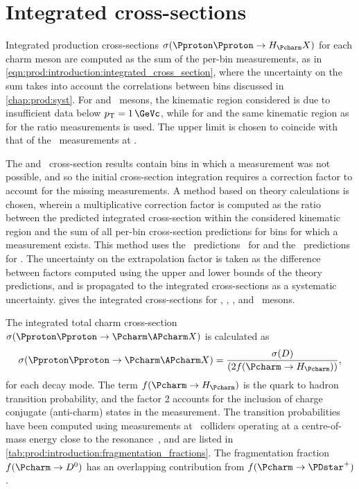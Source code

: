 \section{Integrated cross-sections}
\label{chap:prod:results:integrated}

Integrated production cross-sections $\xsec(\ppToHc{}X)$ for each charm meson 
are computed as the sum of the per-bin measurements, as in 
\cref{eqn:prod:introduction:integrated_cross_section}, where the uncertainty on 
the sum takes into account the correlations between bins discussed in 
\cref{chap:prod:syst}.
For \PDsplus and \PDstarp\ mesons, the kinematic region considered is 
 due to insufficient data below $\pT = \SI{1}{\GeVc}$, 
while for \PDzero and \PDplus the same kinematic region as for the ratio 
measurements is used.
The upper limit is chosen to coincide with that of the \lhcb\ measurements at 
.

The \PDzero and \PDstarp\ cross-section results contain bins in which a 
measurement was not possible, and so the initial cross-section integration 
requires a correction factor to account for the missing measurements.
A method based on theory calculations is chosen, wherein a multiplicative 
correction factor is computed as the ratio between the predicted integrated 
cross-section within the considered kinematic region and the sum of all per-bin 
cross-section predictions for bins for which a measurement exists.
This method uses the \nnpdfl\ predictions~\cite{Gauld:2015yia} for \PDzero and 
the \fonll\ predictions~\cite{Cacciari:2015fta} for \PDstarp.
The uncertainty on the extrapolation factor is taken as the difference between 
factors computed using the upper and lower bounds of the theory predictions, 
and is propagated to the integrated cross-sections as a systematic uncertainty.
 gives the integrated 
cross-sections for \PDzero, \PDplus, \PDsplus, and \PDstarp\ mesons.

The integrated total charm cross-section $\xsec(\ppToccbarX)$ is calculated as 
\begin{equation}
  \xsec(\ppToccbarX) = \frac{\xsec(D)}{(2f(\cToHc))},
\end{equation}
for each decay mode.
The term $f(\cToHc)$ is the quark to hadron transition probability, and the 
factor 2 accounts for the inclusion of charge conjugate (anti-charm) states in 
the measurement.
The transition probabilities have been computed using measurements at \epem\ 
colliders operating at a centre-of-mass energy close to the \PUpsilonFourS 
resonance~\cite{PDG2008}, and are listed in 
\cref{tab:prod:introduction:fragmentation_fractions}.
The fragmentation fraction $f(\decay{\Pcharm}{\PDzero})$ has an overlapping 
contribution
from $f(\decay{\Pcharm}{\PDstarp})$.

